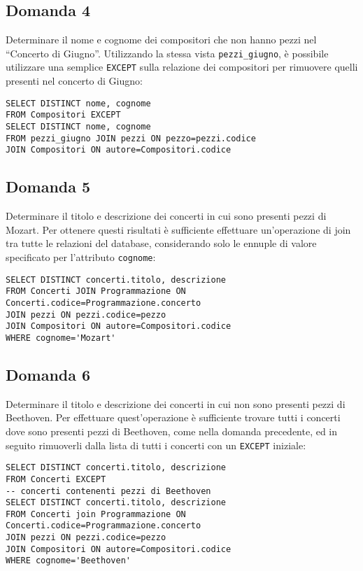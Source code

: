 \documentclass{article}
\numberwithin{equation}{subsection}
\begin{document}
\subsection*{Domanda 4}
Determinare il nome e cognome dei compositori che non hanno pezzi nel ``Concerto di Giugno''. Utilizzando la stessa vista \verb|pezzi_giugno|, è possibile utilizzare una semplice \verb|EXCEPT| sulla 
relazione dei compositori per rimuovere quelli presenti nel concerto di Giugno:
\begin{verbatim}
SELECT DISTINCT nome, cognome
FROM Compositori EXCEPT
SELECT DISTINCT nome, cognome
FROM pezzi_giugno JOIN pezzi ON pezzo=pezzi.codice 
JOIN Compositori ON autore=Compositori.codice
\end{verbatim}

\subsection*{Domanda 5}
Determinare il titolo e descrizione dei concerti in cui sono presenti pezzi di Mozart. Per ottenere questi risultati è sufficiente effettuare un'operazione di join tra tutte le relazioni del database, 
considerando solo le ennuple di valore specificato per l'attributo \verb|cognome|:
\begin{verbatim}
SELECT DISTINCT concerti.titolo, descrizione 
FROM Concerti JOIN Programmazione ON Concerti.codice=Programmazione.concerto
JOIN pezzi ON pezzi.codice=pezzo
JOIN Compositori ON autore=Compositori.codice
WHERE cognome='Mozart'
\end{verbatim}

\subsection*{Domanda 6}
Determinare il titolo e descrizione dei concerti in cui non sono presenti pezzi di Beethoven. Per effettuare quest'operazione è sufficiente trovare tutti i concerti dove sono presenti 
pezzi di Beethoven, come nella domanda precedente, ed in seguito rimuoverli dalla lista di tutti i concerti con un \verb|EXCEPT| iniziale:
\begin{verbatim}
SELECT DISTINCT concerti.titolo, descrizione
FROM Concerti EXCEPT
-- concerti contenenti pezzi di Beethoven
SELECT DISTINCT concerti.titolo, descrizione 
FROM Concerti join Programmazione ON Concerti.codice=Programmazione.concerto
JOIN pezzi ON pezzi.codice=pezzo
JOIN Compositori ON autore=Compositori.codice
WHERE cognome='Beethoven'
\end{verbatim}
\end{document}
